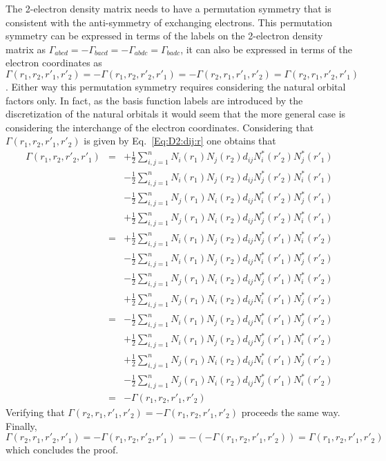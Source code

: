\documentclass[pra,nofootinbib]{revtex4-1}
\begin{document}
The 2-electron density matrix needs to have a permutation symmetry that is
consistent with the anti-symmetry of exchanging electrons.
This permutation symmetry can be expressed in terms of the labels on 
the 2-electron density matrix as
$\Gamma_{abcd} = -\Gamma_{bacd} = -\Gamma_{abdc} = \Gamma_{badc}$,
it can also be expressed in terms of the electron coordinates as
$\Gamma(r_1,r_2,r'_1,r'_2) = -\Gamma(r_1,r_2,r'_2,r'_1) = -\Gamma(r_2,r_1,r'_1,r'_2) = \Gamma(r_2,r_1,r'_2,r'_1)$.
Either way this permutation symmetry requires considering the natural orbital
factors only. In fact, as the basis function labels are introduced
by the discretization of the natural orbitals it would seem that the more
general case is considering the interchange of the electron coordinates. 
Considering that $\Gamma(r_1,r_2,r'_1,r'_2)$ is given by Eq.~\ref{Eq:D2:dij:r} one
obtains that
\begin{eqnarray}
   \Gamma(r_1,r_2,r'_2,r'_1)
   &=&+ \frac{1}{2}\sum_{i,j=1}^{n} N_i(r_1)N_j(r_2) d_{ij} N_i^*(r'_2)N_j^*(r'_1) \nonumber \\
   &&-  \frac{1}{2}\sum_{i,j=1}^{n} N_i(r_1)N_j(r_2) d_{ij} N_j^*(r'_2)N_i^*(r'_1) \nonumber \\
   &&-  \frac{1}{2}\sum_{i,j=1}^{n} N_j(r_1)N_i(r_2) d_{ij} N_i^*(r'_2)N_j^*(r'_1) \nonumber \\
   &&+  \frac{1}{2}\sum_{i,j=1}^{n} N_j(r_1)N_i(r_2) d_{ij} N_j^*(r'_2)N_i^*(r'_1) \\
   &=&+ \frac{1}{2}\sum_{i,j=1}^{n} N_i(r_1)N_j(r_2) d_{ij} N_j^*(r'_1)N_i^*(r'_2) \nonumber \\
   &&-  \frac{1}{2}\sum_{i,j=1}^{n} N_i(r_1)N_j(r_2) d_{ij} N_i^*(r'_1)N_j^*(r'_2) \nonumber \\
   &&-  \frac{1}{2}\sum_{i,j=1}^{n} N_j(r_1)N_i(r_2) d_{ij} N_j^*(r'_1)N_i^*(r'_2) \nonumber \\
   &&+  \frac{1}{2}\sum_{i,j=1}^{n} N_j(r_1)N_i(r_2) d_{ij} N_i^*(r'_1)N_j^*(r'_2) \\
   &=&- \frac{1}{2}\sum_{i,j=1}^{n} N_i(r_1)N_j(r_2) d_{ij} N_i^*(r'_1)N_j^*(r'_2) \nonumber \\
   &&+  \frac{1}{2}\sum_{i,j=1}^{n} N_i(r_1)N_j(r_2) d_{ij} N_j^*(r'_1)N_i^*(r'_2) \nonumber \\
   &&+  \frac{1}{2}\sum_{i,j=1}^{n} N_j(r_1)N_i(r_2) d_{ij} N_i^*(r'_1)N_j^*(r'_2) \nonumber \\
   &&-  \frac{1}{2}\sum_{i,j=1}^{n} N_j(r_1)N_i(r_2) d_{ij} N_j^*(r'_1)N_i^*(r'_2) \\
   &=& -\Gamma(r_1,r_2,r'_1,r'_2)
\end{eqnarray}
Verifying that $\Gamma(r_2,r_1,r'_1,r'_2) = -\Gamma(r_1,r_2,r'_1,r'_2)$ proceeds the same way.
Finally, 
$\Gamma(r_2,r_1,r'_2,r'_1) = -\Gamma(r_1,r_2,r'_2,r'_1)= -(-\Gamma(r_1,r_2,r'_1,r'_2)) = \Gamma(r_1,r_2,r'_1,r'_2)$
which concludes the proof.
\end{document}
